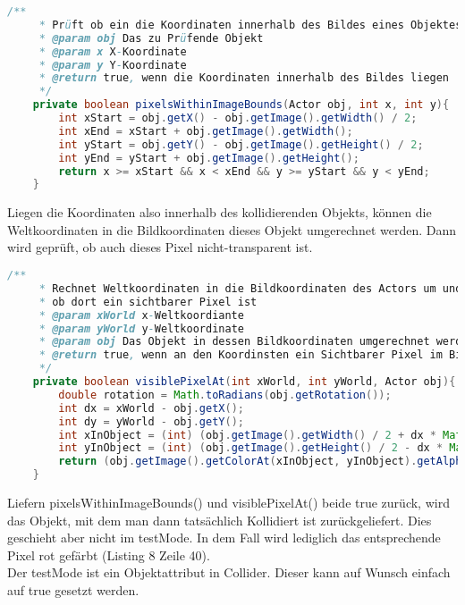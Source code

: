 \documentclass{pi1}
\begin{document}
\begin{lstlisting}[caption={\emph{pixelsWithinImageBounds(Actor obj, int x, int y)}-Methode}, firstnumber=97, language=Java]
/**
     * Prüft ob ein die Koordinaten innerhalb des Bildes eines Objektes liegen
     * @param obj Das zu Prüfende Objekt
     * @param x X-Koordinate
     * @param y Y-Koordinate
     * @return true, wenn die Koordinaten innerhalb des Bildes liegen
     */
    private boolean pixelsWithinImageBounds(Actor obj, int x, int y){
        int xStart = obj.getX() - obj.getImage().getWidth() / 2;
        int xEnd = xStart + obj.getImage().getWidth();
        int yStart = obj.getY() - obj.getImage().getHeight() / 2;
        int yEnd = yStart + obj.getImage().getHeight();
        return x >= xStart && x < xEnd && y >= yStart && y < yEnd;
    }
\end{lstlisting}

Liegen die Koordinaten also innerhalb des kollidierenden Objekts, können die Weltkoordinaten in die Bildkoordinaten dieses Objekt umgerechnet werden. Dann wird geprüft, ob auch dieses Pixel nicht-transparent ist.

\begin{lstlisting}[caption={\emph{visiblePixelAt(int xWorld, int yWorld, Actor obj)}-Methode}, firstnumber=80, language=Java]
/**
     * Rechnet Weltkoordinaten in die Bildkoordinaten des Actors um und prüft
     * ob dort ein sichtbarer Pixel ist
     * @param xWorld x-Weltkoordiante
     * @param yWorld y-Weltkoordinate
     * @param obj Das Objekt in dessen Bildkoordinaten umgerechnet werden soll
     * @return true, wenn an den Koordinsten ein Sichtbarer Pixel im Bild ist
     */
    private boolean visiblePixelAt(int xWorld, int yWorld, Actor obj){
        double rotation = Math.toRadians(obj.getRotation());
        int dx = xWorld - obj.getX();
        int dy = yWorld - obj.getY();
        int xInObject = (int) (obj.getImage().getWidth() / 2 + dx * Math.cos(rotation) + dy * Math.sin(rotation));    
        int yInObject = (int) (obj.getImage().getHeight() / 2 - dx * Math.sin(rotation) + dy * Math.cos(rotation));
        return (obj.getImage().getColorAt(xInObject, yInObject).getAlpha() > 0 );
    }
\end{lstlisting}

Liefern pixelsWithinImageBounds() und visiblePixelAt() beide true zurück, wird das Objekt, mit dem man dann tatsächlich Kollidiert ist zurückgeliefert. Dies geschieht aber nicht im testMode. In dem Fall wird lediglich das entsprechende Pixel rot gefärbt (Listing 8 Zeile 40).\\
Der testMode ist ein Objektattribut in Collider. Dieser kann auf Wunsch einfach auf true gesetzt werden.
\end{document}
